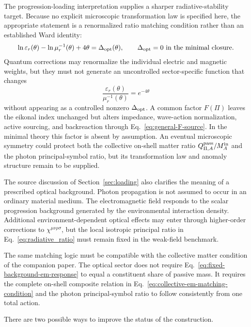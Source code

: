 \documentclass[12pt]{article}
\begin{document}
The progression-loading interpretation supplies a sharper radiative-stability target.  Because no explicit microscopic transformation law is specified here, the appropriate statement is a renormalized ratio matching condition rather than an established Ward identity:
\begin{equation}
 \ln\varepsilon_r(\theta)-\ln\mu_r^{-1}(\theta)+4\theta
 =\Delta_{\rm opt}(\theta),
 \qquad
 \Delta_{\rm opt}=0
 \ \text{in the minimal closure}.
\label{eq:optical-ratio-matching}
\end{equation}
Quantum corrections may renormalize the individual electric and magnetic weights, but they must not generate an uncontrolled sector-specific function that changes
\begin{equation}
 \frac{\varepsilon_r(\theta)}{\mu_r^{-1}(\theta)}=e^{-4\theta}
\label{eq:radiative_ratio}
\end{equation}
without appearing as a controlled nonzero \(\Delta_{\rm opt}\).  A common factor $F(\Pi)$ leaves the eikonal index unchanged but alters impedance, wave-action normalization, active sourcing, and backreaction through Eq.~\eqref{eq:general-F-source}.  In the minimal theory this factor is absent by assumption.  An eventual microscopic symmetry could protect both the collective on-shell matter ratio $Q_{\Pi,A}^{\rm pass}/M_A^{\rm in}$ and the photon principal-symbol ratio, but its transformation law and anomaly structure remain to be supplied.

The source discussion of Section~\ref{sec:loading} also clarifies the meaning of a prescribed optical background.  Photon propagation is not assumed to occur in an ordinary material medium.  The electromagnetic field responds to the scalar progression background generated by the environmental interaction density.  Additional environment-dependent optical effects may enter through higher-order corrections to $\chi^{\mu\nu\rho\sigma}$, but the local isotropic principal ratio in Eq.~\eqref{eq:radiative_ratio} must remain fixed in the weak-field benchmark.

The same matching logic must be compatible with the collective matter condition of the companion paper.  The optical sector does not require Eq.~\eqref{eq:fixed-background-em-response} to equal a constituent share of passive mass.  It requires the complete on-shell composite relation in Eq.~\eqref{eq:collective-em-matching-condition} and the photon principal-symbol ratio to follow consistently from one total action.

There are two possible ways to improve the status of the construction.
\end{document}
